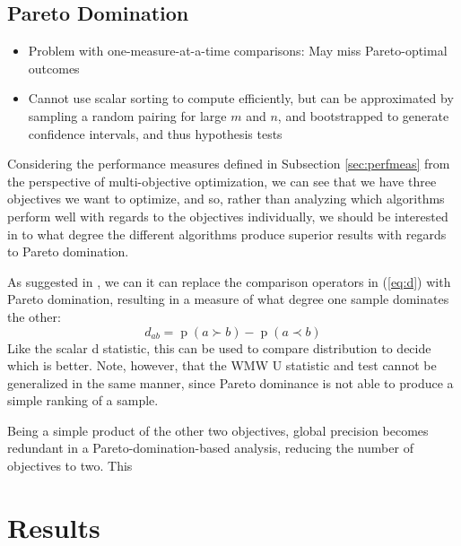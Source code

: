 \documentclass[sigconf, anonymous=false]{acmart}
\newcommand{\paren}[1]{\left(#1\right)}
\newcommand{\opp}[2]{\operatorname{#1}\paren{#2}}
\begin{document}
\subsection{Pareto Domination}\label{method:pareto}
\begin{itemize}
\item Problem with one-measure-at-a-time comparisons: May miss Pareto-optimal outcomes
\item Cannot use scalar sorting to compute efficiently, but can be approximated by sampling a random pairing for large $m$ and $n$, and bootstrapped to generate confidence intervals, and thus hypothesis tests
\end{itemize}
Considering the performance measures defined in Subsection \ref{sec:perfmeas} from the perspective of multi-objective optimization, we can see that we have three objectives we want to optimize, and so, rather than analyzing which algorithms perform well with regards to the objectives individually, we should be interested in to what degree the different algorithms produce superior results with regards to Pareto domination.

As suggested in \cite{Neumann2015}, we can it can replace the comparison operators in (\ref{eq:d}) with Pareto domination, resulting in a measure of what degree one sample dominates the other:
\[ d_{ab} = \opp{p}{a \succ b} - \opp{p}{a \prec b} \]
Like the scalar d statistic, this can be used to compare distribution to decide which is better. Note, however, that the WMW U statistic and test cannot be generalized in the same manner, since Pareto dominance is not able to produce a simple ranking of a sample. 

Being a simple product of the other two objectives, global precision becomes redundant in a Pareto-domination-based analysis, reducing the number of objectives to two. This 


\section{Results}

\end{document}
